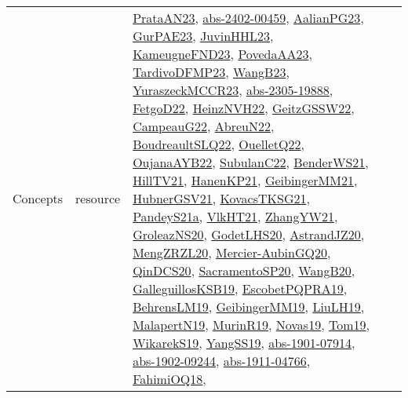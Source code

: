 {\begin{longtable}{lp{3cm}>{\raggedright}p{6cm}>{\raggedright}p{6cm}p{8cm}}
Concepts & resource & \href{articles/PrataAN23.pdf}{PrataAN23}\cite{PrataAN23}, \href{articles/abs-2402-00459.pdf}{abs-2402-00459}\cite{abs-2402-00459}, \href{papers/AalianPG23.pdf}{AalianPG23}\cite{AalianPG23}, \href{articles/GurPAE23.pdf}{GurPAE23}\cite{GurPAE23}, \href{papers/JuvinHHL23.pdf}{JuvinHHL23}\cite{JuvinHHL23}, \href{papers/KameugneFND23.pdf}{KameugneFND23}\cite{KameugneFND23}, \href{papers/PovedaAA23.pdf}{PovedaAA23}\cite{PovedaAA23}, \href{papers/TardivoDFMP23.pdf}{TardivoDFMP23}\cite{TardivoDFMP23}, \href{papers/WangB23.pdf}{WangB23}\cite{WangB23}, \href{articles/YuraszeckMCCR23.pdf}{YuraszeckMCCR23}\cite{YuraszeckMCCR23}, \href{articles/abs-2305-19888.pdf}{abs-2305-19888}\cite{abs-2305-19888}, \href{articles/FetgoD22.pdf}{FetgoD22}\cite{FetgoD22}, \href{articles/HeinzNVH22.pdf}{HeinzNVH22}\cite{HeinzNVH22}, \href{papers/GeitzGSSW22.pdf}{GeitzGSSW22}\cite{GeitzGSSW22}, \href{articles/CampeauG22.pdf}{CampeauG22}\cite{CampeauG22}, \href{articles/AbreuN22.pdf}{AbreuN22}\cite{AbreuN22}, \href{papers/BoudreaultSLQ22.pdf}{BoudreaultSLQ22}\cite{BoudreaultSLQ22}, \href{papers/OuelletQ22.pdf}{OuelletQ22}\cite{OuelletQ22}, \href{papers/OujanaAYB22.pdf}{OujanaAYB22}\cite{OujanaAYB22}, \href{articles/SubulanC22.pdf}{SubulanC22}\cite{SubulanC22}, \href{papers/BenderWS21.pdf}{BenderWS21}\cite{BenderWS21}, \href{papers/HillTV21.pdf}{HillTV21}\cite{HillTV21}, \href{papers/HanenKP21.pdf}{HanenKP21}\cite{HanenKP21}, \href{papers/GeibingerMM21.pdf}{GeibingerMM21}\cite{GeibingerMM21}, \href{articles/HubnerGSV21.pdf}{HubnerGSV21}\cite{HubnerGSV21}, \href{papers/KovacsTKSG21.pdf}{KovacsTKSG21}\cite{KovacsTKSG21}, \href{articles/PandeyS21a.pdf}{PandeyS21a}\cite{PandeyS21a}, \href{articles/VlkHT21.pdf}{VlkHT21}\cite{VlkHT21}, \href{articles/ZhangYW21.pdf}{ZhangYW21}\cite{ZhangYW21}, \href{papers/GroleazNS20.pdf}{GroleazNS20}\cite{GroleazNS20}, \href{papers/GodetLHS20.pdf}{GodetLHS20}\cite{GodetLHS20}, \href{articles/AstrandJZ20.pdf}{AstrandJZ20}\cite{AstrandJZ20}, \href{articles/MengZRZL20.pdf}{MengZRZL20}\cite{MengZRZL20}, \href{papers/Mercier-AubinGQ20.pdf}{Mercier-AubinGQ20}\cite{Mercier-AubinGQ20}, \href{articles/QinDCS20.pdf}{QinDCS20}\cite{QinDCS20}, \href{articles/SacramentoSP20.pdf}{SacramentoSP20}\cite{SacramentoSP20}, \href{papers/WangB20.pdf}{WangB20}\cite{WangB20}, \href{papers/GalleguillosKSB19.pdf}{GalleguillosKSB19}\cite{GalleguillosKSB19}, \href{articles/EscobetPQPRA19.pdf}{EscobetPQPRA19}\cite{EscobetPQPRA19}, \href{papers/BehrensLM19.pdf}{BehrensLM19}\cite{BehrensLM19}, \href{papers/GeibingerMM19.pdf}{GeibingerMM19}\cite{GeibingerMM19}, \href{papers/LiuLH19.pdf}{LiuLH19}\cite{LiuLH19}, \href{papers/MalapertN19.pdf}{MalapertN19}\cite{MalapertN19}, \href{papers/MurinR19.pdf}{MurinR19}\cite{MurinR19}, \href{articles/Novas19.pdf}{Novas19}\cite{Novas19}, \href{papers/Tom19.pdf}{Tom19}\cite{Tom19}, \href{articles/WikarekS19.pdf}{WikarekS19}\cite{WikarekS19}, \href{papers/YangSS19.pdf}{YangSS19}\cite{YangSS19}, \href{articles/abs-1901-07914.pdf}{abs-1901-07914}\cite{abs-1901-07914}, \href{articles/abs-1902-09244.pdf}{abs-1902-09244}\cite{abs-1902-09244}, \href{articles/abs-1911-04766.pdf}{abs-1911-04766}\cite{abs-1911-04766}, \href{articles/FahimiOQ18.pdf}{FahimiOQ18}\cite{FahimiOQ18}, 
\end{longtable}}
